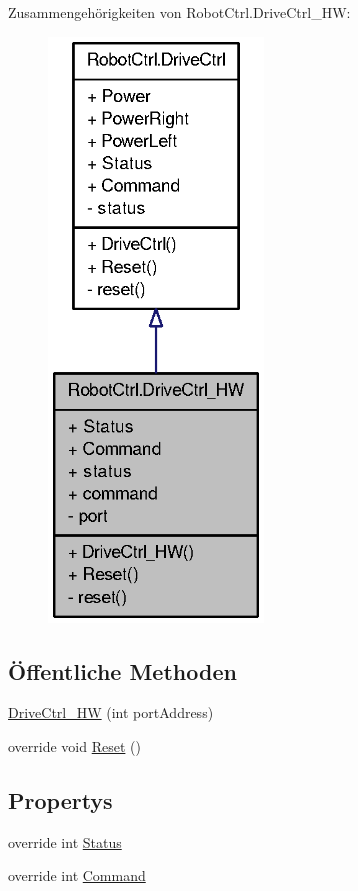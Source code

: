 Zusammengehörigkeiten von RobotCtrl.DriveCtrl\_\-HW:\nopagebreak
\begin{figure}[H]
\begin{center}
\leavevmode
\includegraphics[width=162pt]{class_robot_ctrl_1_1_drive_ctrl___h_w__coll__graph}
\end{center}
\end{figure}
\subsection*{Öffentliche Methoden}
\begin{DoxyCompactItemize}
\item 
\hyperlink{class_robot_ctrl_1_1_drive_ctrl___h_w_a35edb9b280ac1c76f0471ce2204f2235}{DriveCtrl\_\-HW} (int portAddress)
\item 
override void \hyperlink{class_robot_ctrl_1_1_drive_ctrl___h_w_a30785a704b5385ea9c41ad87ebb8f61f}{Reset} ()
\end{DoxyCompactItemize}
\subsection*{Propertys}
\begin{DoxyCompactItemize}
\item 
override int \hyperlink{class_robot_ctrl_1_1_drive_ctrl___h_w_ab77cfbe90640881ca1e051fab36f02ac}{Status}
\item 
override int \hyperlink{class_robot_ctrl_1_1_drive_ctrl___h_w_acc8cbfa5af4849ee85babc540ad63ada}{Command}
\end{DoxyCompactItemize}



